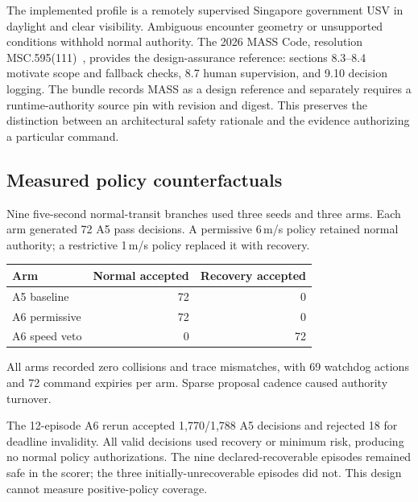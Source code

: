 \documentclass[sigconf,nonacm]{acmart}
\begin{document}
The implemented profile is a remotely supervised Singapore government USV in daylight and clear visibility. Ambiguous encounter geometry or unsupported conditions withhold normal authority. The 2026 MASS Code, resolution MSC.595(111)~\cite{mass}, provides the design-assurance reference: sections 8.3--8.4 motivate scope and fallback checks, 8.7 human supervision, and 9.10 decision logging. The bundle records MASS as a design reference and separately requires a runtime-authority source pin with revision and digest. This preserves the distinction between an architectural safety rationale and the evidence authorizing a particular command.

\subsection{Measured policy counterfactuals}
Nine five-second normal-transit branches used three seeds and three arms. Each arm generated 72 A5 pass decisions. A permissive 6\,m/s policy retained normal authority; a restrictive 1\,m/s policy replaced it with recovery.

\begin{center}
\begin{minipage}{\columnwidth}
\centering
{}
\small
\begin{tabular}{@{}lrr@{}}
\toprule
Arm & Normal accepted & Recovery accepted\\
\midrule
A5 baseline & 72 & 0\\
A6 permissive & 72 & 0\\
A6 speed veto & 0 & 72\\
\bottomrule
\end{tabular}
\end{minipage}
\end{center}

All arms recorded zero collisions and trace mismatches, with 69 watchdog actions and 72 command expiries per arm. Sparse proposal cadence caused authority turnover.

The 12-episode A6 rerun accepted 1,770/1,788 A5 decisions and rejected 18 for deadline invalidity. All valid decisions used recovery or minimum risk, producing no normal policy authorizations. The nine declared-recoverable episodes remained safe in the scorer; the three initially-unrecoverable episodes did not. This design cannot measure positive-policy coverage.
\end{document}
